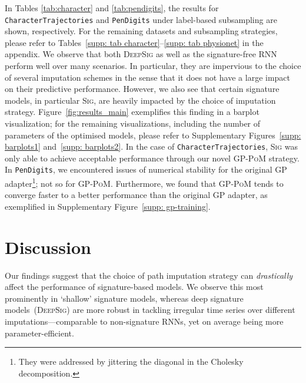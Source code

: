 \documentclass{article}
\begin{document}
In Tables \ref{tab:character} and \ref{tab:pendigits}, the results for
\texttt{CharacterTrajectories} and \texttt{PenDigits} under label-based
subsampling are shown, respectively. For the remaining datasets and
subsampling strategies, please refer to Tables~\ref{supp: tab
character}--\ref{supp: tab physionet} in the appendix. 
%
%
We observe that both \textsc{DeepSig} as well as the signature-free \textsc{RNN} perform well
over many scenarios. In particular, they are impervious to the choice of
several imputation schemes in the sense that it does not have a large
impact on their predictive performance.
%
However, we also see that certain signature models, in particular
\textsc{Sig}, are heavily impacted by the choice of imputation strategy.
Figure~\ref{fig:results_main} exemplifies this finding in a barplot
visualization; for the remaining visualizations, including the number of
parameters of the optimised models, please refer to Supplementary
Figures~\ref{supp: barplots1} and~\ref{supp: barplots2}. In the case of
\texttt{CharacterTrajectories}, \textsc{Sig} was only able to achieve
acceptable performance through our novel \textsc{GP-PoM} strategy. In
\texttt{PenDigits}, we encountered issues of numerical stability for the
original GP adapter\footnote{They were addressed by jittering the
diagonal in the Cholesky decomposition.}; not so for \textsc{GP-PoM}.
Furthermore, we found that \textsc{GP-PoM} tends to converge faster to
a better performance than the original GP adapter, as exemplified in
Supplementary Figure~\ref{supp: gp-training}.

\section{Discussion}

Our findings suggest that the choice of path imputation strategy can
\emph{drastically} affect the performance of signature-based models. We
observe this most prominently in `shallow' signature models, whereas deep signature models~(\textsc{DeepSig})
are more robust in tackling irregular time series over different
imputations---comparable to non-signature RNNs, yet on average being
more parameter-efficient.
\end{document}
